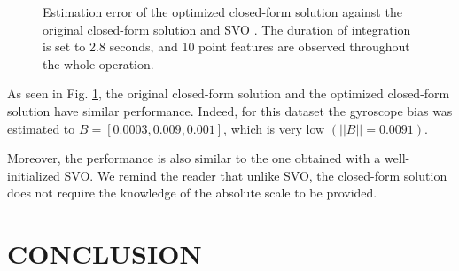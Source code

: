 \documentclass[letterpaper, 10 pt, conference]{ieeeconf}  %
\begin{document}
\begin{figure}
   \centering
   \resizebox{\columnwidth}{!}{}
   \caption{Estimation error of the optimized closed-form solution against the original closed-form solution \cite{Martinelli2014} and SVO \cite{FaesslerICRA15}. The duration of integration is set to 2.8 seconds, and 10 point features are observed throughout the whole operation.\label{fig:valid}}
\end{figure}

As seen in Fig. \ref{fig:valid}, the original closed-form solution and the optimized closed-form solution have similar performance.
Indeed, for this dataset the gyroscope bias was estimated to $B = [0.0003, 0.009, 0.001]$, which is very low $(||B|| = 0.0091)$.

Moreover, the performance is also similar to the one obtained with a well-initialized SVO.
We remind the reader that unlike SVO, the closed-form solution does not require the knowledge of the absolute scale to be provided.






\section{CONCLUSION}\label{SectionConclusion}

\end{document}
